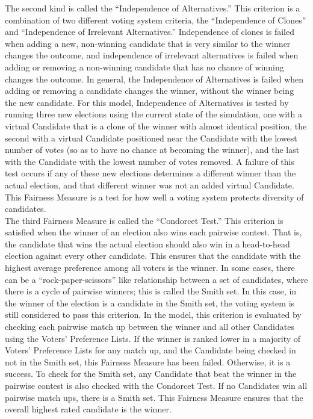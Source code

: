 \documentclass[12pt]{article}
\begin{document}
\qquad The second kind is called the ``Independence of Alternatives.'' This criterion is a combination of two different voting system criteria, the ``Independence of Clones'' and ``Independence of Irrelevant Alternatives.'' Independence of clones is failed when adding a new, non-winning candidate that is very similar to the winner changes the outcome, and independence of irrelevant alternatives is failed when adding or removing a non-winning candidate that has no chance of winning changes the outcome. In general, the Independence of Alternatives is failed when adding or removing a candidate changes the winner, without the winner being the new candidate. For this model, Independence of Alternatives is tested by running three new elections using the current state of the simulation, one with a virtual Candidate that is a clone of the winner with almost identical position, the second with a virtual Candidate positioned near the Candidate with the lowest number of votes (so as to have no chance at becoming the winner), and the last with the Candidate with the lowest number of votes removed. A failure of this test occurs if any of these new elections determines a different winner than the actual election, and that different winner was not an added virtual Candidate. This Fairness Measure is a test for how well a voting system protects diversity of candidates. \\

\qquad The third Fairness Measure is called the ``Condorcet Test.'' This criterion is satisfied when the winner of an election also wins each pairwise contest. That is, the candidate that wins the actual election should also win in a head-to-head election against every other candidate. This ensures that the candidate with the highest average preference among all voters is the winner. In some cases, there can be a ``rock-paper-scissors'' like relationship between a set of candidates, where there is a cycle of pairwise winners; this is called the Smith set. In this case, in the winner of the election is a candidate in the Smith set, the voting system is still considered to pass this criterion. In the model, this criterion is evaluated by checking each pairwise match up between the winner and all other Candidates using the Voters' Preference Lists. If the winner is ranked lower in a majority of Voters' Preference Lists for any match up, and the Candidate being checked in not in the Smith set, this Fairness Measure has been failed. Otherwise, it is a success. To check for the Smith set, any Candidate that beat the winner in the pairwise contest is also checked with the Condorcet Test. If no Candidates win all pairwise match ups, there is a Smith set. This Fairness Measure ensures that the overall highest rated candidate is the winner. \\
\end{document}
